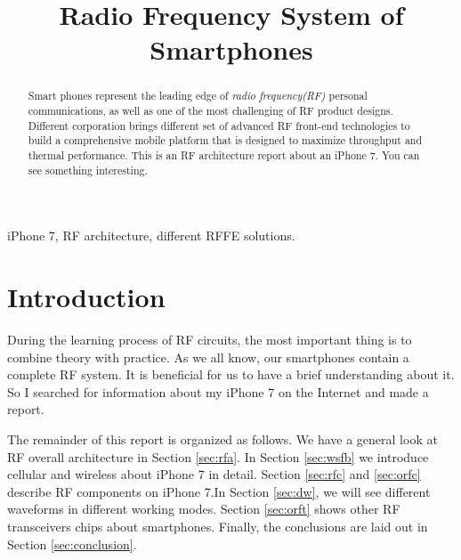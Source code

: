 \documentclass[conference]{IEEEtran}
\begin{document}
\title{Radio Frequency System of Smartphones}


\author{
}






\maketitle

\begin{abstract}
Smart phones represent the leading edge of {\emph{radio frequency(RF)}} personal communications, as well as one of the most challenging of RF product designs. Different corporation brings different set of advanced RF front-end technologies to build a comprehensive mobile platform that is designed to maximize throughput and thermal performance. This is an RF architecture report about an iPhone 7. You can see something interesting.
\end{abstract}

\renewcommand\IEEEkeywordsname{Keywords}
\begin{IEEEkeywords}
iPhone 7, RF architecture, different RFFE solutions.
\end{IEEEkeywords}





\IEEEpeerreviewmaketitle



\section{Introduction}
During the learning process of RF circuits, the most important thing is to combine theory with practice. As we all know, our smartphones contain a complete RF system. It is beneficial for us to have a brief understanding about it. So I searched for information about my iPhone 7 on the Internet and made a report. 

The remainder of this report is organized as follows. We have a general look at RF overall architecture in Section \ref{sec:rfa}. In Section \ref{sec:wsfb} we introduce cellular and wireless about iPhone 7 in detail. Section \ref{sec:rfc} and \ref{sec:orfc} describe RF components on iPhone 7.In Section \ref{sec:dw}, we will see different waveforms in different working modes. Section \ref{sec:orft} shows other RF transceivers chips about smartphones. Finally, the conclusions are laid out in Section \ref{sec:conclusion}.
\end{document}

